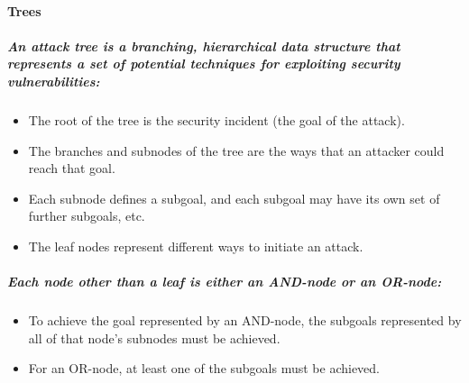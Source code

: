 \documentclass{article}
\begin{document}
                \paragraph{Trees}
               
                \subparagraph{An attack tree is a branching, hierarchical data structure that represents a set of potential techniques for exploiting security vulnerabilities:}
                \begin{itemize}
                    \item The root of the tree is the security incident (the goal of the attack).
                    \item The branches and subnodes of the tree are the ways that an attacker could reach that goal.
                    \item Each subnode defines a subgoal, and each subgoal may have its own set of further subgoals, etc.
                    \item The leaf nodes represent different ways to initiate an attack. 
                \end{itemize}

                \subparagraph{Each node other than a leaf is either an AND-node or an OR-node:}
                    \begin{itemize}
                        \item To achieve the goal represented by an AND-node, the subgoals represented by all of that node’s subnodes must be achieved.
                        \item For an OR-node, at least one of the subgoals must be achieved.
                    \end{itemize}
\end{document}
